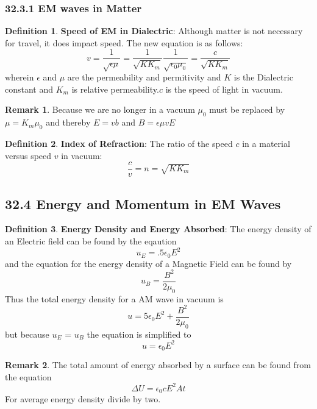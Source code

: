 \documentclass[12pt]{amsart}
\theoremstyle{definition}
\newtheorem{definition}{Definition} %
\newtheorem*{remark}{Remark}        %
\numberwithin{equation}{theorem}    %
\begin{document}
\subsubsection*{32.3.1 EM waves in Matter}

\begin{definition}
    \textbf{Speed of EM in Dialectric}:
    Although matter is not necessary for travel, it does impact speed. The new equation is as follows:
    $$v = \frac{1}{\sqrt{\epsilon\mu}} = \frac{1}{\sqrt{KK_m}}\frac{1}{\sqrt{\epsilon_0\mu_0}} = \frac{c}{\sqrt{KK_m}}$$
    wherein $\epsilon$ and $\mu$ are the permeability and permitivity and $K$ is the Dialectric constant and $K_m$ is relative permeability.$c$ is the speed of light in vacuum.
    \begin{remark}
        Because we are no longer in a vacuum $\mu_0$ must be replaced by $\mu = K_m\mu_0$ and thereby $E = vb$ and $B=\epsilon\mu vE$
    \end{remark}
\end{definition}

\begin{definition}
    \textbf{Index of Refraction}:
    The ratio of the speed $c$ in a material versus speed $v$ in vacuum:$$\frac{c}{v} = n = \sqrt{KK_m}$$
\end{definition}

\subsection*{32.4 Energy and Momentum in EM Waves}

\begin{definition}
    \textbf{Energy Density and Energy Absorbed}:
    The energy density of an Electric field can be found by the eqaution $$u_E = .5\epsilon_0E^2$$
    and the equation for the energy density of a Magnetic Field can be found by $$u_B = \frac{B^2}{2\mu_0}$$
    Thus the total energy density for a AM wave in vacuum is $$u =5\epsilon_0E^2 + \frac{B^2}{2\mu_0}$$ but because $u_E$ = $u_B$ the equation is simplified to $$u=\epsilon_0E^2$$
    \begin{remark}
        The total amount of energy absorbed by a surface can be found from the equation
        $$\Delta U = \epsilon_0cE^2At$$
        For average energy density divide by two.
    \end{remark}
\end{definition}
\end{document}

